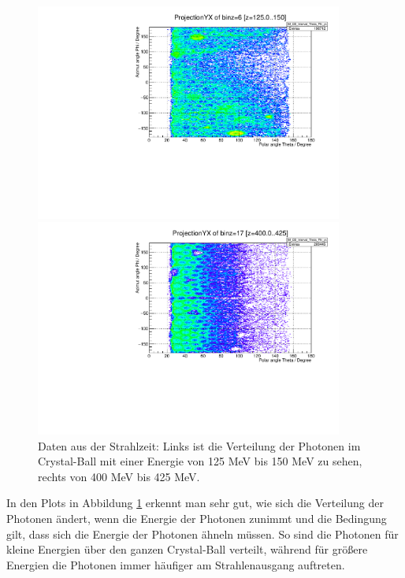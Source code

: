 \documentclass[a4paper,11pt,oneside,final,german,openbib,pdftex]{scrbook}
\begin{document}
{\begin{figure}[h!]
	\centering
	\begin{minipage}{0.45\textwidth}
		\centering
		\includegraphics[width=0.9\textwidth]{20170504ThetaPhiEnergySymmetric2014_10_125}
	\end{minipage}
	\hfill
	\begin{minipage}{0.45\textwidth}
		\centering
		\includegraphics[width=0.9\textwidth]{20170504ThetaPhiEnergySymmetric2014_10_400}
	\end{minipage}
	
	\caption[Strahlzeit: Verteilung der symmetrischen Photonen im CB f\"ur verschiedene Energien]{Daten aus der Strahlzeit: Links ist die Verteilung der Photonen im Crystal-Ball mit einer Energie von 125 MeV bis 150 MeV zu sehen, rechts von 400 MeV bis 425 MeV.}
	\label{fig:Verteilung-im-CB}
\end{figure}

In den Plots in Abbildung \ref{fig:Verteilung-im-CB} erkennt man sehr gut, wie sich die Verteilung der Photonen \"andert, wenn die Energie der Photonen zunimmt und die Bedingung gilt, dass sich die Energie der Photonen \"ahneln m\"ussen. So sind die Photonen f\"ur kleine Energien \"uber den ganzen Crystal-Ball verteilt, w\"ahrend f\"ur gr\"o{\ss}ere Energien die Photonen immer h\"aufiger am Strahlenausgang auftreten.

}
\end{document}
